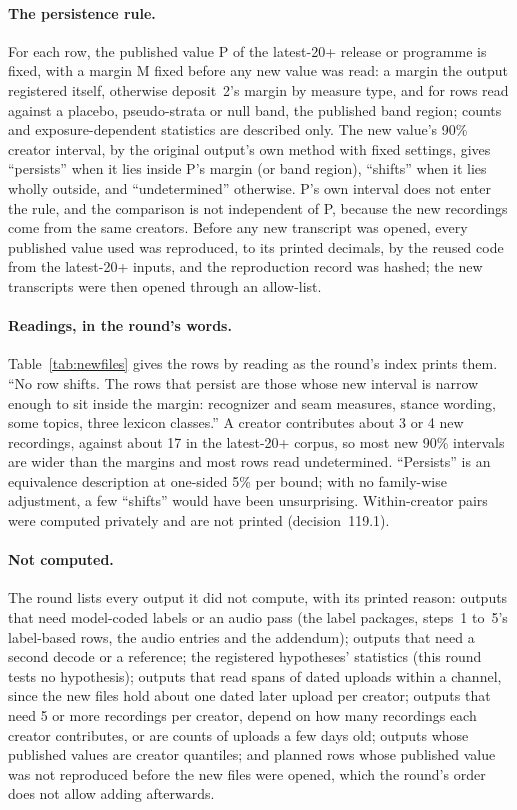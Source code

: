 \paragraph{The persistence rule.} For each row, the published value P of the latest-20+ release or programme is fixed,
with a margin M fixed before any new value was read: a margin the output registered itself, otherwise deposit~2's
margin by measure type, and for rows read against a placebo, pseudo-strata or null band, the published band region;
counts and exposure-dependent statistics are described only. The new value's 90\% creator interval, by the original
output's own method with fixed settings, gives ``persists'' when it lies inside P's margin (or band region), ``shifts'' when it lies wholly outside, and ``undetermined'' otherwise. P's own interval does not
enter the rule, and the comparison is not independent of P, because the new recordings come from the same creators.
Before any new transcript was opened, every published value used was reproduced, to its printed decimals, by the
reused code from the latest-20+ inputs, and the reproduction record was hashed; the new transcripts were then opened
through an allow-list.

\paragraph{Readings, in the round's words.} Table~\ref{tab:newfiles} gives the rows by reading as the round's index
prints them. ``No row shifts. The rows that persist are those whose new interval is narrow enough to sit inside the
margin: recognizer and seam measures, stance wording, some topics, three lexicon classes.'' A creator contributes about
3 or 4 new recordings, against about 17 in the latest-20+ corpus, so most new 90\% intervals are wider than the margins
and most rows read undetermined. ``Persists'' is an equivalence description at one-sided 5\% per bound; with no
family-wise adjustment, a few ``shifts'' would have been unsurprising. Within-creator pairs were computed privately and
are not printed (decision~119.1).

\paragraph{Not computed.} The round lists every output it did not compute, with its printed reason: outputs that need
model-coded labels or an audio pass (the label packages, steps~1 to~5's label-based rows, the audio entries and the
addendum); outputs that need a second decode or a reference; the registered hypotheses' statistics (this round tests no
hypothesis); outputs that read spans of dated uploads within a channel, since the new files hold about one dated later
upload per creator; outputs that need 5 or more recordings per creator, depend on how many recordings each creator
contributes, or are counts of uploads a few days old; outputs whose published values are creator quantiles; and planned
rows whose published value was not reproduced before the new files were opened, which the round's order does not allow
adding afterwards.

